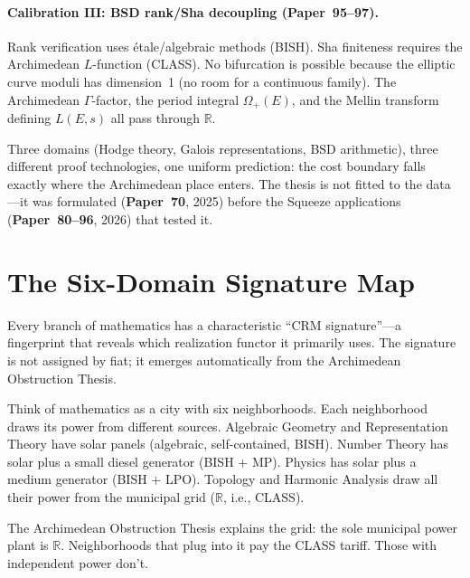 \documentclass[11pt,twoside,openany]{report}
\theoremstyle{remark}
\newcommand{\BISH}{\textsf{BISH}}
\newcommand{\LPO}{\textsf{LPO}}
\newcommand{\CLASS}{\textsf{CLASS}}
\newcommand{\MP}{\textsf{MP}}
\newcommand{\paperref}[1]{\textbf{Paper~#1}}
\begin{document}
\paragraph{Calibration III: BSD rank/Sha decoupling (\paperref{95--97}).}
Rank verification uses \'etale/algebraic methods (\BISH). Sha finiteness requires the Archimedean $L$-function (\CLASS). No bifurcation is possible because the elliptic curve moduli has dimension~1 (no room for a continuous family). The Archimedean $\Gamma$-factor, the period integral $\Omega_+(E)$, and the Mellin transform defining $L(E,s)$ all pass through $\mathbb{R}$.

\begin{keyrefbox}
  Three domains (Hodge theory, Galois representations, BSD arithmetic), three different proof technologies, one uniform prediction: the cost boundary falls exactly where the Archimedean place enters. The thesis is not fitted to the data---it was formulated (\paperref{70}, 2025) before the Squeeze applications (\paperref{80--96}, 2026) that tested it.
\end{keyrefbox}


\section{The Six-Domain Signature Map}

Every branch of mathematics has a characteristic ``CRM signature''---a fingerprint that reveals which realization functor it primarily uses. The signature is not assigned by fiat; it emerges automatically from the Archimedean Obstruction Thesis.

\begin{analogybox}
Think of mathematics as a city with six neighborhoods. Each neighborhood draws its power from different sources. Algebraic Geometry and Representation Theory have solar panels (algebraic, self-contained, \BISH). Number Theory has solar plus a small diesel generator (\BISH{} + \MP). Physics has solar plus a medium generator (\BISH{} + \LPO). Topology and Harmonic Analysis draw all their power from the municipal grid ($\mathbb{R}$, i.e., \CLASS).

The Archimedean Obstruction Thesis explains the grid: the sole municipal power plant is $\mathbb{R}$. Neighborhoods that plug into it pay the \CLASS{} tariff. Those with independent power don't.
\end{analogybox}
\end{document}
